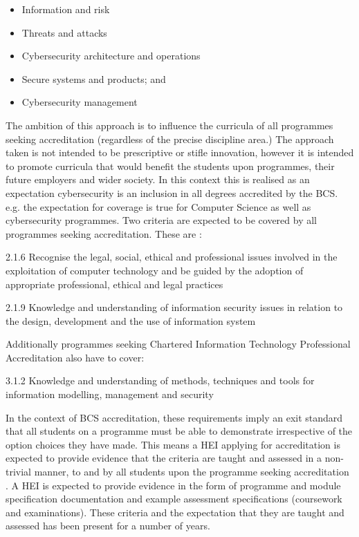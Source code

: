 \documentclass[conference]{IEEEtran}
\begin{document}
\begin{itemize}
    \item Information and risk 
    \item Threats and attacks 
    \item Cybersecurity architecture and operations
    \item Secure systems and products; and 
    \item Cybersecurity management
\end{itemize}

The ambition of this approach is to influence the curricula of all programmes seeking accreditation (regardless of the precise discipline area.)  The approach taken is not intended to be prescriptive or stifle innovation, however it is intended to promote curricula that would benefit the students upon programmes, their future employers and wider society.  In this context this is realised as an expectation cybersecurity is an inclusion in all degrees accredited by the BCS. e.g. the expectation for coverage is true for Computer Science as well as cybersecurity programmes. Two criteria are expected to be covered by all programmes seeking accreditation. These are \cite{BCS2018a}:

2.1.6 Recognise the legal, social, ethical and professional issues involved in the exploitation of computer technology and be guided by the adoption of appropriate professional, ethical and legal practices

2.1.9 Knowledge and understanding of information security issues in relation to the design, development and the use of information system

Additionally programmes seeking Chartered Information Technology Professional Accreditation also have to cover:

3.1.2 Knowledge and understanding of methods, techniques and tools for information modelling, management and security

In the context of BCS accreditation, these requirements imply an exit standard that all students on a programme must be able to demonstrate irrespective of the option choices they have made. This means a HEI applying for accreditation is expected to provide evidence that the criteria are taught and assessed in a non-trivial manner, to and by all students upon the programme seeking accreditation . A HEI is expected to provide evidence in the form of programme and module specification documentation and example assessment specifications (coursework and examinations). These criteria and the expectation that they are taught and assessed has been present for a number of years.
\end{document}

